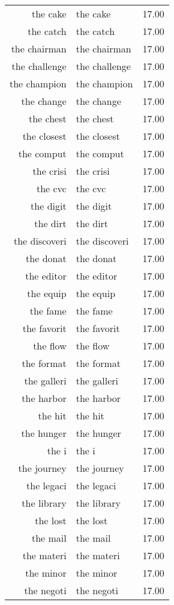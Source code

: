 \begin{table}[ht]
\begin{tabular}{rlr}
  the cake & the cake & 17.00 \\ 
  the catch & the catch & 17.00 \\ 
  the chairman & the chairman & 17.00 \\ 
  the challenge & the challenge & 17.00 \\ 
  the champion & the champion & 17.00 \\ 
  the change & the change & 17.00 \\ 
  the chest & the chest & 17.00 \\ 
  the closest & the closest & 17.00 \\ 
  the comput & the comput & 17.00 \\ 
  the crisi & the crisi & 17.00 \\ 
  the cvc & the cvc & 17.00 \\ 
  the digit & the digit & 17.00 \\ 
  the dirt & the dirt & 17.00 \\ 
  the discoveri & the discoveri & 17.00 \\ 
  the donat & the donat & 17.00 \\ 
  the editor & the editor & 17.00 \\ 
  the equip & the equip & 17.00 \\ 
  the fame & the fame & 17.00 \\ 
  the favorit & the favorit & 17.00 \\ 
  the flow & the flow & 17.00 \\ 
  the format & the format & 17.00 \\ 
  the galleri & the galleri & 17.00 \\ 
  the harbor & the harbor & 17.00 \\ 
  the hit & the hit & 17.00 \\ 
  the hunger & the hunger & 17.00 \\ 
  the i & the i & 17.00 \\ 
  the journey & the journey & 17.00 \\ 
  the legaci & the legaci & 17.00 \\ 
  the library & the library & 17.00 \\ 
  the lost & the lost & 17.00 \\ 
  the mail & the mail & 17.00 \\ 
  the materi & the materi & 17.00 \\ 
  the minor & the minor & 17.00 \\ 
  the negoti & the negoti & 17.00 \\ 

\end{tabular}
\end{table}
